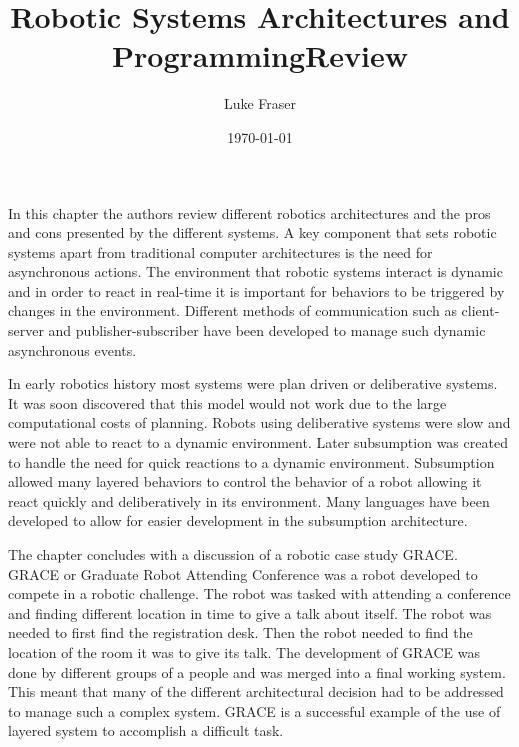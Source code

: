 \documentclass[letterpaper]{article}
\begin{document}
\title{{Robotic Systems Architectures and Programming\large Review} \\   }
\author{Luke Fraser}
\date{\today}
\maketitle

\begingroup
\renewcommand{\section}[2]{}


\endgroup

\section*{Summary}
In this chapter the authors review different robotics architectures and the pros and cons presented by the different systems. A key component that sets robotic systems apart from traditional computer architectures is the need for asynchronous actions. The environment that robotic systems interact is dynamic and in order to react in real-time it is important for behaviors to be triggered by changes in the environment. Different methods of communication such as client-server and publisher-subscriber have been developed to manage such dynamic asynchronous events.

In early robotics history most systems were plan driven or deliberative systems. It was soon discovered that this model would not work due to the large computational costs of planning. Robots using deliberative systems were slow and were not able to react to a dynamic environment. Later subsumption was created to handle the need for quick reactions to a dynamic environment. Subsumption allowed many layered behaviors to control the behavior of a robot allowing it react quickly and deliberatively in its environment. Many languages have been developed to allow for easier development in the subsumption architecture.

The chapter concludes with a discussion of a robotic case study GRACE. GRACE or Graduate Robot Attending Conference was a robot developed to compete in a robotic challenge. The robot was tasked with attending a conference and finding different location in time to give a talk about itself. The robot was needed to first find the registration desk. Then the robot needed to find the location of the room it was to give its talk. The development of GRACE was done by different groups of a people and was merged into a final working system. This meant that many of the different architectural decision had to be addressed to manage such a complex system. GRACE is a successful example of the use of layered system to accomplish a difficult task. 
\end{document}
